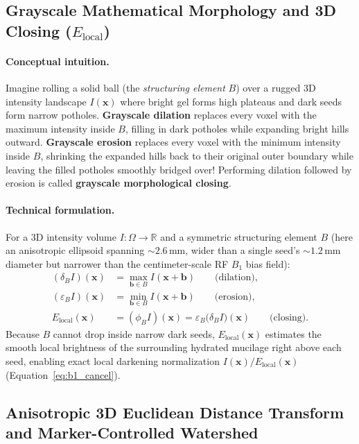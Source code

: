 \documentclass[10pt,a4paper]{article}
\renewcommand{\_}{\origunderscore\allowbreak}
\begin{document}
\subsection{Grayscale Mathematical Morphology and 3D Closing ($E_{\text{local}}$)}

\paragraph{Conceptual intuition.} Imagine rolling a solid ball (the \emph{structuring element} $B$) over a rugged 3D intensity landscape $I(\mathbf{x})$ where bright gel forms high plateaus and dark seeds form narrow potholes. \textbf{Grayscale dilation} replaces every voxel with the maximum intensity inside $B$, filling in dark potholes while expanding bright hills outward. \textbf{Grayscale erosion} replaces every voxel with the minimum intensity inside $B$, shrinking the expanded hills back to their original outer boundary while leaving the filled potholes smoothly bridged over! Performing dilation followed by erosion is called \textbf{grayscale morphological closing}.

\paragraph{Technical formulation.} For a 3D intensity volume $I : \Omega \to \mathbb{R}$ and a symmetric structuring element $B$ (here an anisotropic ellipsoid spanning $\sim 2.6\,\text{mm}$, wider than a single seed's $\sim 1.2\,\text{mm}$ diameter but narrower than the centimeter-scale RF $B_1$ bias field):
\begin{align}
    (\delta_B I)(\mathbf{x}) &= \max_{\mathbf{b} \in B} I(\mathbf{x} + \mathbf{b}) \qquad \text{(dilation)}, \\
    (\varepsilon_B I)(\mathbf{x}) &= \min_{\mathbf{b} \in B} I(\mathbf{x} + \mathbf{b}) \qquad \text{(erosion)}, \\
    E_{\text{local}}(\mathbf{x}) &= (\phi_B I)(\mathbf{x}) = \varepsilon_B\bigl(\delta_B I\bigr)(\mathbf{x}) \qquad \text{(closing)}.
    \label{eq:grey_closing}
\end{align}
Because $B$ cannot drop inside narrow dark seeds, $E_{\text{local}}(\mathbf{x})$ estimates the smooth local brightness of the surrounding hydrated mucilage right above each seed, enabling exact local darkening normalization $I(\mathbf{x}) / E_{\text{local}}(\mathbf{x})$ (Equation~\ref{eq:b1_cancel}).

\subsection{Anisotropic 3D Euclidean Distance Transform and Marker-Controlled Watershed}
\end{document}
